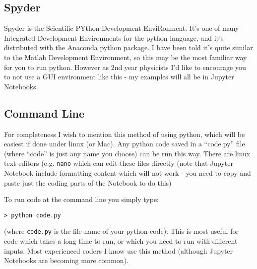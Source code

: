 \documentclass[%
 reprint,
 amsmath,amssymb,
 aps,
]{revtex4-1}
\begin{document}
\subsection{Spyder} 

Spyder is the Scientific PYthon Development EnviRonment. It's one of many Integrated Development Environments for the python language, and it's distributed with the Anaconda python package. I have been told it's quite similar to the Matlab Development Environment, so this may be the most familiar way for you to run python. However as 2nd year physicists I'd like to encourage you to not use a GUI environment like this - my examples will all be in Jupyter Notebooks. 



\subsection{Command Line}

For completeness I wish to mention this method of using python, which will be easiest if done under linux (or Mac). Any python code saved in a ``code.py'' file (where ``code'' is just any name you choose) can be run this way. There are linux text editors (e.g. {\tt nano} which can edit these files directly (note that Jupyter Notebook include formatting content which will not work - you need to copy and paste just the coding parts of the Notebook to do this)

To run code at the command line you simply type: 

\begin{verbatim}
> python code.py
\end{verbatim}

(where {\tt code.py} is the file name of your python code). This is most useful for code which takes a long time to run, or which you need to run with different inputs. Most experienced coders I know use this method (although Jupyter Notebooks are becoming more common). 
\end{document}
